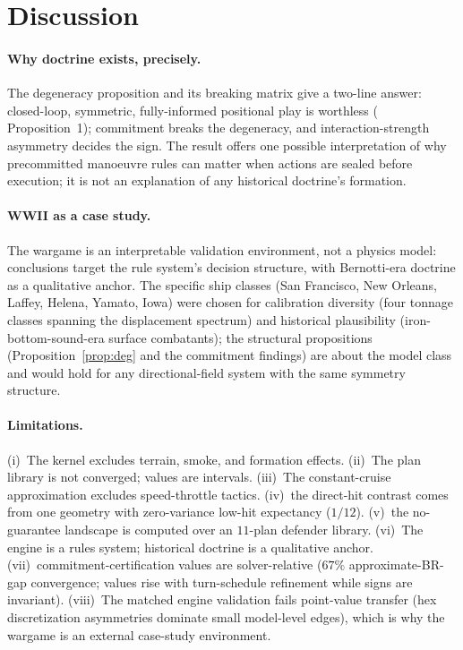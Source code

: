\documentclass[12pt,a4paper]{article}
\begin{document}
\section{Discussion}\label{sec:discussion}

\paragraph{Why doctrine exists, precisely.}  The degeneracy proposition and
its breaking matrix give a two-line answer: closed-loop, symmetric,
fully-informed positional play is worthless ( Proposition~1); commitment
breaks the degeneracy, and interaction-strength asymmetry decides the
sign.  The result offers one possible interpretation of why precommitted
manoeuvre rules can matter when actions are sealed before execution; it is
not an explanation of any historical doctrine's formation.

\paragraph{WWII as a case study.}  The wargame is an interpretable
validation environment, not a physics model: conclusions target the rule
system's decision structure, with Bernotti-era doctrine as a qualitative
anchor.  The specific ship classes (San Francisco, New Orleans, Laffey,
Helena, Yamato, Iowa) were chosen for calibration diversity (four tonnage
classes spanning the displacement spectrum) and historical plausibility
(iron-bottom-sound-era surface combatants); the structural propositions
(Proposition~\ref{prop:deg} and the commitment findings) are about the
model class and would hold for any directional-field system with the same
symmetry structure.

\paragraph{Limitations.}  (i)~The kernel excludes terrain, smoke, and
formation effects.  (ii)~The plan library is not converged; values are
intervals.  (iii)~The constant-cruise approximation excludes
speed-throttle tactics.  (iv)~the direct-hit contrast comes from one
geometry with zero-variance low-hit expectancy ($1/12$).  (v)~the
no-guarantee landscape is computed over an $11$-plan defender library.  (vi)~The
engine is a rules system; historical doctrine is a qualitative anchor.
(vii)~commitment-certification values are solver-relative ($67\%$ approximate-BR-gap
convergence; values rise with turn-schedule refinement while signs are
invariant).  (viii)~The matched engine validation fails point-value
transfer (hex discretization asymmetries dominate small model-level
edges), which is why the wargame is an external case-study environment.
\end{document}
